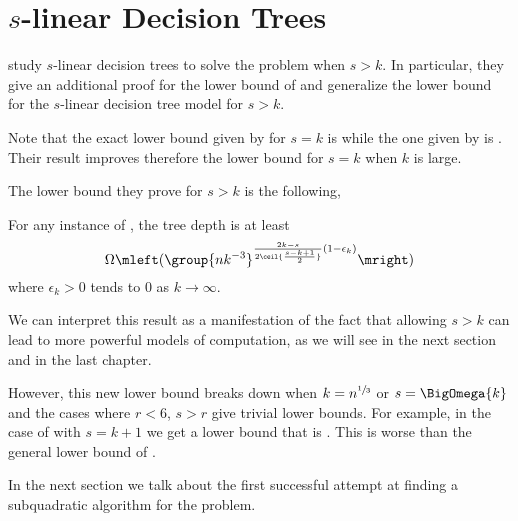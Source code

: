 \section{$s$-linear Decision Trees}

\citet*{ailon:2005} study $s$-linear decision trees to solve the \kSUM
problem when $s > k$. In particular, they give an additional proof for the
 lower bound of \citet{erickson:1999} and
generalize the lower bound for the \(s\)-linear decision tree model for $s > k$.

Note that the exact lower bound given by \citet*{erickson:1999} for \(s = k\) is
 while the one given by
\citet*{ailon:2005} is . Their result
improves therefore the lower bound for \(s = k\) when \(k\) is large.

The lower bound they prove for \(s > k\) is the following,
\begin{theorem}
For any instance of \kLDT, the tree depth is at least
\begin{displaymath}
\Omega\mleft(\group{nk^{-3}}^{\frac{2k-s}{2\ceil{\frac{s-k+1}{2}}}
(1-\epsilon_k) }\mright)
\end{displaymath}
where \(\epsilon_k > 0\) tends to \(0\) as \(k \to\infty\).
\end{theorem}

We can interpret this result as a manifestation of the fact that allowing \(s >
k\) can lead to more powerful models of computation, as we will see in the next
section and in the last chapter.

However, this new lower bound breaks down when
\(k = n^{\sfrac{1}{3}}\) or \(s = \BigOmega{k}\) and the cases where \(r <
6\), \(s > r\) give trivial lower bounds. For example, in the case
of \threeSUM with \(s = k + 1\) we get a lower bound that is . This is
worse than the general lower bound of .

In the next section we talk about the first successful attempt at finding
a subquadratic algorithm for the \threeSUM problem.
